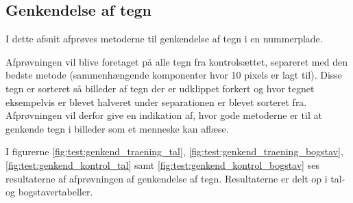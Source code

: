 \begin{comment}
Problemer ved 10: tegn der er smeltet sammen pga. søm skruer: OE26906 og ----290. Godt udskåret: UX33152, skæve plader et problem. go kontrast: YE39734.

Problemer ved 20: for stort område giver komponenter der ikke klippes bort, fordi kontrastforstærkning giver et andet resultat, her ville dynamisk kontrast-blok størrelse måske hjælpe. Dårlig indskrænk XK29750. TS57793: GOD(?) 

Problemer ve 30: stadig for stort område: giver komponenter udenfor der vælges. dårlig indskrænk, især foran? eksempler.

\end{comment}


\subsection{Genkendelse af tegn}
I dette afsnit afprøves metoderne til genkendelse af tegn i en nummerplade. %

Afprøvningen vil blive foretaget på alle tegn fra kontrolsættet, separeret med den bedste metode (sammenhængende komponenter hvor 10 pixels er lagt til). Disse tegn er sorteret så billeder af tegn der er udklippet forkert og hvor tegnet eksempelvis er blevet halveret under separationen er blevet sorteret fra. Afprøvningen vil derfor give en indikation af, hvor gode metoderne er til at genkende tegn i billeder som et menneske kan aflæse.





I figurerne \vref{fig:test:genkend_traening_tal}, \vref{fig:test:genkend_traening_bogstav}, \vref{fig:test:genkend_kontrol_tal} samt \vref{fig:test:genkend_kontrol_bogstav} ses resultaterne af afprøvningen af genkendelse af tegn. Resultaterne er delt op i tal- og bogstavertabeller.

